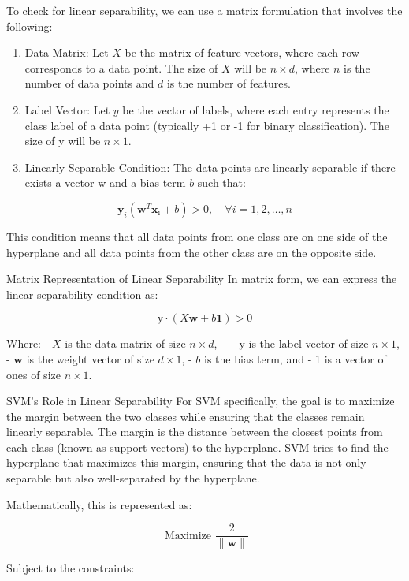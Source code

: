 \documentclass[
  12 pt,
  a4paper,
]{book}
\providecommand{\tightlist}{%
  \setlength{\itemsep}{0pt}\setlength{\parskip}{0pt}}
\numberwithin{equation}{section}
\theoremstyle{plain}      %
\theoremstyle{definition} %
\theoremstyle{remark}     %
\theoremstyle{note}         %
\begin{document}
To check for linear separability, we can use a matrix formulation that
involves the following:

\begin{enumerate}
\def\labelenumi{\arabic{enumi}.}
\tightlist
\item
  Data Matrix: Let \(X\) be the matrix of feature vectors, where each
  row corresponds to a data point. The size of \(X\) will be
  \(n \times d\), where \(n\) is the number of data points and \(d\) is
  the number of features.
\item
  Label Vector: Let \(y\) be the vector of labels, where each entry
  represents the class label of a data point (typically +1 or -1 for
  binary classification). The size of y will be \(n \times 1\).
\item
  Linearly Separable Condition: The data points are linearly separable
  if there exists a vector w and a bias term \(b\) such that:
\end{enumerate}

\[
\mathbf{y}_i\left(\mathbf{w}^T \mathbf{x}_{\mathrm{i}}+b\right)>0, \quad \forall i=1,2, \ldots, n
\]

This condition means that all data points from one class are on one side
of the hyperplane and all data points from the other class are on the
opposite side.

Matrix Representation of Linear Separability In matrix form, we can
express the linear separability condition as:

\[
\mathrm{y} \cdot(X \mathbf{w}+b \mathbf{1})>0
\]

Where: - \(X\) is the data matrix of size \(n \times d\), -
\(\quad \mathrm{y}\) is the label vector of size \(n \times 1\), -
\(\mathbf{w}\) is the weight vector of size \(d \times 1\), - \(b\) is
the bias term, and - 1 is a vector of ones of size \(n \times 1\).

SVM's Role in Linear Separability For SVM specifically, the goal is to
maximize the margin between the two classes while ensuring that the
classes remain linearly separable. The margin is the distance between
the closest points from each class (known as support vectors) to the
hyperplane. SVM tries to find the hyperplane that maximizes this margin,
ensuring that the data is not only separable but also well-separated by
the hyperplane.

Mathematically, this is represented as:

\[
\text { Maximize } \frac{2}{\|\mathbf{w}\|}
\]

Subject to the constraints:
\end{document}
